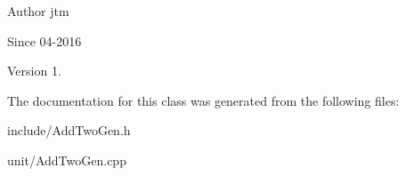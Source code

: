 \begin{DoxyAuthor}{Author}
jtm 
\end{DoxyAuthor}
\begin{DoxySince}{Since}
04-\/2016 
\end{DoxySince}
\begin{DoxyVersion}{Version}
1. 
\end{DoxyVersion}


The documentation for this class was generated from the following files\+:\begin{DoxyCompactItemize}
\item 
include/Add\+Two\+Gen.\+h\item 
unit/Add\+Two\+Gen.\+cpp\end{DoxyCompactItemize}
